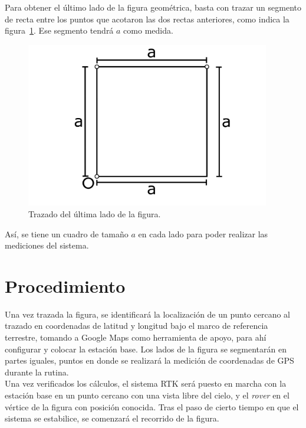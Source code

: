 Para obtener el último lado de la figura geométrica, basta con trazar un segmento de recta entre los puntos que acotaron las dos rectas anteriores, como indica la figura~\ref{fig:TrazFig10}. Ese segmento tendrá $a$ como medida.

\begin{figure}[H]
\centering
\includegraphics[width=0.95\textwidth]{Figures/Cuad10}
\caption[Trazado del último lado de la figura.]{Trazado del última lado de la figura.}
\label{fig:TrazFig10}
\end{figure}

Así, se tiene un cuadro de tamaño $a$ en cada lado para poder realizar las mediciones del sistema.

\section{Procedimiento}

Una vez trazada la figura, se identificará la localización de un punto cercano al trazado en coordenadas de latitud y longitud bajo el marco de referencia terrestre, tomando a Google Maps como herramienta de apoyo, para ahí configurar y colocar la estación base. Los lados de la figura se segmentarán en partes iguales, puntos en donde se realizará la medición de coordenadas de GPS durante la rutina.\\

Una vez verificados los cálculos, el sistema RTK será puesto en marcha con la estación base en un punto cercano con una vista libre del cielo, y el \textit{rover} en el vértice de la figura con posición conocida. Tras el paso de cierto tiempo en que el sistema se estabilice, se comenzará el recorrido de la figura.\\

